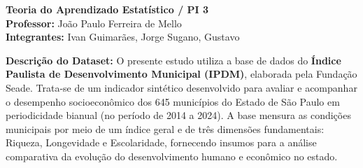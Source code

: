 \documentclass[12pt]{article}
\begin{document}
\begin{center}
    {\fontsize{16pt}{20pt}\selectfont \textbf{Teoria do Aprendizado Estatístico / PI 3}}\\[0.3cm]
    {\fontsize{12pt}{15pt}\selectfont \textbf{Professor:} João Paulo Ferreira de Mello}\\[0.2cm]
    {\fontsize{12pt}{15pt}\selectfont \textbf{Integrantes:} Ivan Guimarães, Jorge Sugano, Gustavo}\\[0.5cm]
\end{center}

\noindent
\textbf{Descrição do Dataset:} O presente estudo utiliza a base de dados do \textbf{Índice Paulista de Desenvolvimento Municipal (IPDM)}, elaborada pela Fundação Seade. Trata-se de um indicador sintético desenvolvido para avaliar e acompanhar o desempenho socioeconômico dos 645 municípios do Estado de São Paulo em periodicidade bianual (no período de 2014 a 2024). A base mensura as condições municipais por meio de um índice geral e de três dimensões fundamentais: Riqueza, Longevidade e Escolaridade, fornecendo insumos para a análise comparativa da evolução do desenvolvimento humano e econômico no estado.

\vspace{0.4cm}
\end{document}
